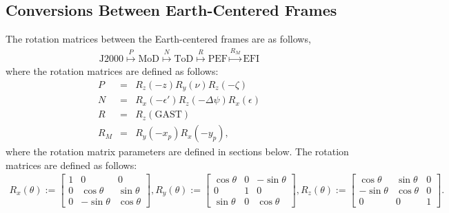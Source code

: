 \documentclass [12pt, a4paper] {article}
\begin{document}
\subsection{Conversions Between Earth-Centered Frames}
The rotation matrices between the Earth-centered frames are as follows,
\begin {eqnarray}
  \textrm{J2000}
  \overset{P}{\mapsto}
  \textrm{MoD}
  \overset{N}{\mapsto}
  \textrm{ToD}
  \overset{R}{\mapsto}
  \textrm{PEF}
  \overset{R_M}{\mapsto}
  \textrm{EFI}
\end {eqnarray}
where the rotation matrices are defined as follows:
\begin {eqnarray}
  P &=& R_z(-z)R_y(\nu)R_z(-\zeta) \\
  N &=& R_x(-\epsilon')R_z(-\Delta\psi)R_x(\epsilon) \\
  R &=& R_z(\textrm{GAST}) \\
  R_M &=& R_y(-x_p) R_x(-y_p),
\end {eqnarray}
where the rotation matrix parameters are defined in sections below. The rotation matrices
are defined as follows:
\begin {eqnarray}
  R_x(\theta) := 
  \begin {bmatrix}
    1 & 0 & 0 \\
    0 & \cos\theta & \sin\theta \\
    0 & -\sin\theta & \cos\theta 
  \end {bmatrix}
  ,
  R_y(\theta) := 
  \begin {bmatrix}
    \cos\theta & 0 & - \sin\theta \\
    0 & 1 & 0 \\
    \sin\theta & 0 & \cos\theta 
  \end {bmatrix}
  ,
  R_z(\theta) := 
  \begin {bmatrix}
    \cos\theta & \sin\theta & 0 \\
    -\sin\theta & \cos\theta & 0 \\
    0 & 0 & 1
  \end {bmatrix}.
\end {eqnarray}
\end{document}
